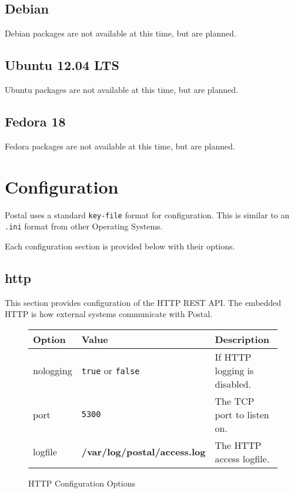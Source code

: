 \documentclass[12pt]{article}
\newcommand{\file}[1]{{\bf\ttfamily #1}}
\begin{document}
\subsection{Debian}

Debian packages are not available at this time, but are planned.

\subsection{Ubuntu 12.04 LTS}

Ubuntu packages are not available at this time, but are planned.

\subsection{Fedora 18}

Fedora packages are not available at this time, but are planned.

\section{Configuration}

Postal uses a standard \verb|key-file| format for configuration.
This is similar to an \verb|.ini| format from other Operating Systems.

Each configuration section is provided below with their options.

\subsection{http}

This section provides configuration of the HTTP REST API.
The embedded HTTP is how external systems communicate with Postal.

\begin{figure}[h!]
\centering
\begin{tabular}{l l l}
\hline
Option & Value & Description \\
\hline
nologging & \verb|true| or \verb|false| & If HTTP logging is disabled. \\
port & \verb|5300| & The TCP port to listen on. \\
logfile & \file{/var/log/postal/access.log} & The HTTP access logfile. \\
\hline
\end{tabular}
\caption{HTTP Configuration Options}
\end{figure}
\end{document}
